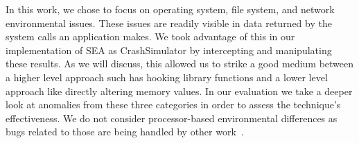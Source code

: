 In this work, we chose to focus on operating system,
file system, and network
environmental issues.
These issues are
readily visible in data returned
by the system calls
an application makes.
We took advantage of this in our implementation of SEA as CrashSimulator by
intercepting and manipulating these results.
As we will discuss, this allowed us to strike a good medium between a
higher level approach such has hooking library functions and a lower level
approach like directly altering memory values.
In our evaluation we take a deeper look at anomalies from
these three categories in order to assess the technique's effectiveness.
We do not consider processor-based environmental differences as bugs related to those are being handled by other
work~\cite{Alglave:2018:FSC:3173162.3177156}.
